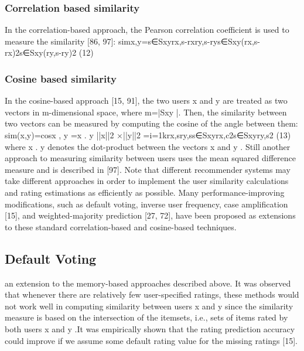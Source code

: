 \subsubsection{Correlation based similarity}
In the correlation-based approach, the Pearson correlation coefficient is used to measure the similarity [86, 97]:
simx,y=s∈Sxyrx,s-rxry,s-rys∈Sxy(rx,s-rx)2s∈Sxy(ry,s-ry)2         (12)

\subsubsection{Cosine based similarity}
In the cosine-based approach [15, 91], the two users x and y are treated as two vectors in m-dimensional space, where m=|Sxy |. Then, the similarity between two vectors can be measured by computing the cosine of the angle between them:
sim(x,y)=cosx , y =x . y ||x||2 ×||y||2 =i=1krx,sry,ss∈Sxyrx,c2s∈Sxyry,s2         (13)
where x . y  denotes the dot-product between the vectors x and y . Still another approach  to measuring similarity between users uses the mean squared difference measure and is described in [97]. Note that different recommender systems may take different approaches in order to implement the user similarity calculations and rating estimations as efficiently as possible.
Many performance-improving modifications, such as default voting, inverse user frequency, case amplification [15], and weighted-majority prediction [27, 72], have been proposed as extensions to these standard correlation-based and cosine-based techniques.
\subsection{Default Voting}
an extension to the memory-based approaches described above. It was observed that whenever there are relatively few user-specified ratings, these methods would not work well in computing similarity between users x and y since the similarity measure is based on the intersection of the itemsets, i.e., sets of items rated by both users x and y .It was empirically shown that the rating prediction accuracy could improve if we assume some default rating value for the missing ratings [15].

